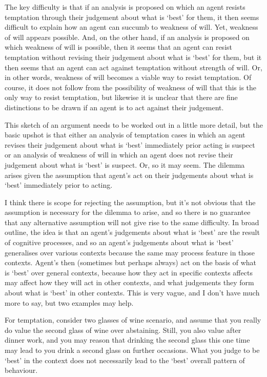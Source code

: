 \documentclass[10pt]{article}
\begin{document}
The key difficulty is that if an analysis is proposed on which an agent resists temptation through their judgement about what is `best' for them, it then seems difficult to explain how an agent can succumb to weakness of will.
Yet, weakness of will appears possible.
And, on the other hand, if an analysis is proposed on which weakness of will is possible, then it seems that an agent can resist temptation without revising their judgement about what is `best' for them, but it then seems that an agent can act against temptation without strength of will.
Or, in other words, weakness of will becomes a viable way to resist temptation.
Of course, it does not follow from the possibility of weakness of will that this is the only way to resist temptation, but likewise it is unclear that there are fine distinctions to be drawn if an agent is to act against their judgement.

This sketch of an argument needs to be worked out in a little more detail, but the basic upshot is that either an analysis of temptation cases in which an agent revises their judgement about what is `best' immediately prior acting is suspect or an analysis of weakness of will in which an agent does not revise their judgement about what is `best' is suspect.
Or, so it may seem.
The dilemma arises given the assumption that agent's act on their judgements about what is `best' immediately prior to acting.

I think there is scope for rejecting the assumption, but it's not obvious that the assumption is necessary for the dilemma to arise, and so there is no guarantee that any alternative assumption will not give rise to the same difficulty.
In broad outline, the idea is that an agent's judgements about what is `best' are the result of cognitive processes, and so an agent's judgements about what is `best' generalises over various contexts because the same may process feature in those contexts.
Agent's then (sometimes but perhaps always) act on the basis of what is `best' over general contexts, because how they act in specific contexts affects may affect how they will act in other contexts, and what judgements they form about what is `best' in other contexts.
This is very vague, and I don't have much more to say, but two examples may help.

For temptation, consider \citeauthor{Bratman:2007ab} two glasses of wine scenario, and assume that you really do value the second glass of wine over abstaining.
Still, you also value after dinner work, and you may reason that drinking the second glass this one time may lead to you drink a second glass on further occasions.
What you judge to be `best' in the context does not necessarily lead to the `best' overall pattern of behaviour.
\end{document}

